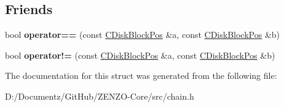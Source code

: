 \subsection*{Friends}
\begin{DoxyCompactItemize}
\item 
\mbox{\label{struct_c_disk_block_pos_a04787eb60da48b80e0f7fb402c6896fe}} 
bool {\bfseries operator==} (const \mbox{\hyperlink{struct_c_disk_block_pos}{C\+Disk\+Block\+Pos}} \&a, const \mbox{\hyperlink{struct_c_disk_block_pos}{C\+Disk\+Block\+Pos}} \&b)
\item 
\mbox{\label{struct_c_disk_block_pos_af77481af6cf1d32788ba67c29cc061b5}} 
bool {\bfseries operator!=} (const \mbox{\hyperlink{struct_c_disk_block_pos}{C\+Disk\+Block\+Pos}} \&a, const \mbox{\hyperlink{struct_c_disk_block_pos}{C\+Disk\+Block\+Pos}} \&b)
\end{DoxyCompactItemize}


The documentation for this struct was generated from the following file\+:\begin{DoxyCompactItemize}
\item 
D\+:/\+Documentz/\+Git\+Hub/\+Z\+E\+N\+Z\+O-\/\+Core/src/chain.\+h\end{DoxyCompactItemize}
